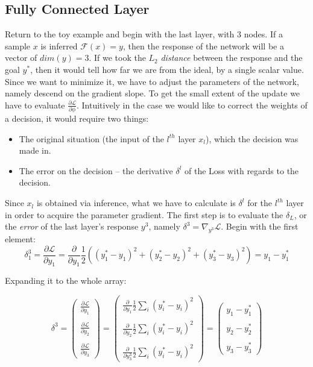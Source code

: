 \subsection{Fully Connected Layer}
Return to the toy example and begin with the last layer, with $3$ nodes. If a sample $x$ is inferred $\mathcal{F}(x)=y$, then the response of the network will be a vector of $dim(y) = 3$. If we took the $L_2$ \emph{distance} between the response and the goal $y^*$, then it would tell how far we are from the ideal, by a single scalar value. Since we want to minimize it, we have to adjust the parameters of the network, namely descend on the gradient slope. To get the small extent of the update we have to evaluate $\frac{\partial\mathcal{L}}{\partial \phi}$. 
Intuitively in the case we would like to correct the weights of a decision, it would require two things:
\begin{itemize}
    \item[] The original situation (the input of the $l^{th}$ layer $x_l$), which the decision was made in.
    \item[] The error on the decision -- the derivative $\delta^l$ of the Loss with regards to the decision.
\end{itemize}
Since $x_l$ is obtained via inference, what we have to calculate is $\delta^l$ for the $l^{th}$ layer in order to acquire the parameter gradient.
The first step is to evaluate the $\delta_L$, or the \emph{error} of the last layer's response $y^3$, namely $\delta^3 = \nabla_{y^3} \mathcal{L}$.
Begin with the first element: 
$$
    \delta_1^3 = 
    \frac{\partial \mathcal{L}}{\partial y_1} = 
    \frac{\partial}{\partial y_1}\frac{1}{2}\left((y^*_1 - y_1)^2 + (y^*_2 - y_2)^2 + (y^*_3 - y_3)^2\right) = y_1 - y^*_1
$$
\begin{center}
Expanding it to the whole array:
\end{center}
$$
    \delta^3 = \begin{pmatrix}
     \frac{\partial \mathcal{L}}{\partial y_1}\\ \\
    \frac{\partial \mathcal{L}}{\partial y_2} \\ \\
    \frac{\partial \mathcal{L}}{\partial y_3}
    \end{pmatrix} = \begin{pmatrix}
     \frac{\partial}{\partial y_1} \frac{1}{2}\sum_i(y_i^*-y_i)^2\\ \\
    \frac{\partial}{\partial y_2} \frac{1}{2}\sum_i(y_i^*-y_i)^2 \\ \\
    \frac{\partial}{\partial y^3_3}  \frac{1}{2}\sum_i(y_i^*-y_i)^2
    \end{pmatrix} = \begin{pmatrix}
     {y_1-y^*_1}\\ \\
     {y_2-y^*_2}\\ \\
     {y_3-y^*_3}
    \end{pmatrix} 
$$
